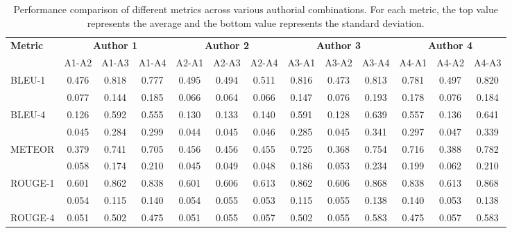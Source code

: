 \begin{table}[htbp]
  \caption{Performance comparison of different metrics across various authorial combinations. For each metric, the top value represents the average and the bottom value represents the standard deviation.}
  \label{tab:mpii-authors}
  \centering
  \setlength{\tabcolsep}{5.6pt} %
  \begin{adjustbox}{max width=\textwidth}
    \begin{tabular}{@{}l*{12}{c}@{}}
      \toprule
      \textbf{Metric} & \multicolumn{3}{c}{\textbf{Author 1}} & \multicolumn{3}{c}{\textbf{Author 2}} & \multicolumn{3}{c}{\textbf{Author 3}} & \multicolumn{3}{c}{\textbf{Author 4}} \\
      \cmidrule(lr){2-4} \cmidrule(lr){5-7} \cmidrule(lr){8-10} \cmidrule(lr){11-13}
                      & A1-A2 & A1-A3 & A1-A4 & A2-A1 & A2-A3 & A2-A4 & A3-A1 & A3-A2 & A3-A4 & A4-A1 & A4-A2 & A4-A3 \\
      \midrule
      BLEU-1 \cite{papineni2002bleu}        & 0.476 & 0.818 & 0.777 & 0.495 & 0.494 & 0.511 & 0.816 & 0.473 & 0.813 & 0.781 & 0.497 & 0.820 \\
                    & 0.077 & 0.144 & 0.185 & 0.066 & 0.064 & 0.066 & 0.147 & 0.076 & 0.193 & 0.178 & 0.076 & 0.184 \\
      \cmidrule(lr){2-13}
      BLEU-4 \cite{papineni2002bleu}        & 0.126 & 0.592 & 0.555 & 0.130 & 0.133 & 0.140 & 0.591 & 0.128 & 0.639 & 0.557 & 0.136 & 0.641 \\
                    & 0.045 & 0.284 & 0.299 & 0.044 & 0.045 & 0.046 & 0.285 & 0.045 & 0.341 & 0.297 & 0.047 & 0.339 \\
      \cmidrule(lr){2-13}
      METEOR \cite{banerjee2005meteor}        & 0.379 & 0.741 & 0.705 & 0.456 & 0.456 & 0.455 & 0.725 & 0.368 & 0.754 & 0.716 & 0.388 & 0.782 \\
                    & 0.058 & 0.174 & 0.210 & 0.045 & 0.049 & 0.048 & 0.186 & 0.053 & 0.234 & 0.199 & 0.062 & 0.210 \\
      \cmidrule(lr){2-13}
      ROUGE-1 \cite{lin2004rouge}       & 0.601 & 0.862 & 0.838 & 0.601 & 0.606 & 0.613 & 0.862 & 0.606 & 0.868 & 0.838 & 0.613 & 0.868 \\
                    & 0.054 & 0.115 & 0.140 & 0.054 & 0.055 & 0.053 & 0.115 & 0.055 & 0.138 & 0.140 & 0.053 & 0.138 \\
      \cmidrule(lr){2-13}
      ROUGE-4 \cite{lin2004rouge}       & 0.051 & 0.502 & 0.475 & 0.051 & 0.055 & 0.057 & 0.502 & 0.055 & 0.583 & 0.475 & 0.057 & 0.583 \\

\end{tabular}
\end{adjustbox}
\end{table}
